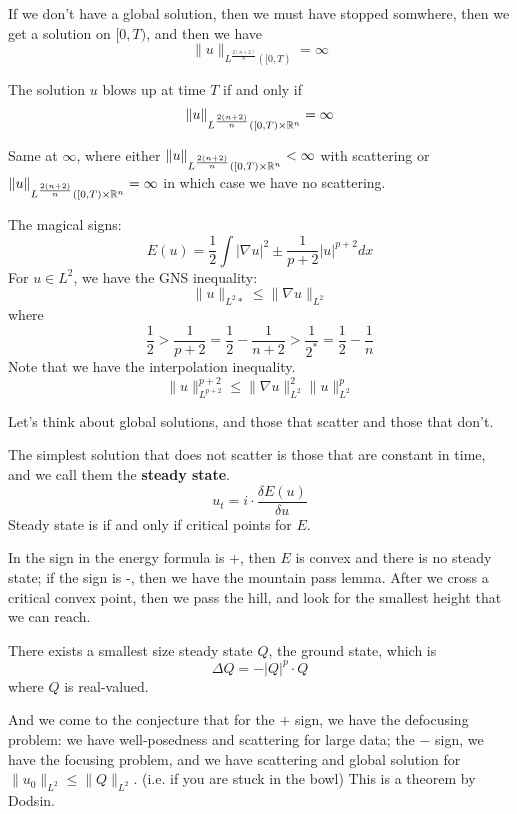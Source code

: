 If we don't have a global solution, then we must have stopped somwhere, then we get a solution on $[0,T)$, and then we have
\begin{equation*}
    \|u\|_{L^\frac{2(n+2)}{n}([0,T)}=\infty
\end{equation*}
\begin{theorem}
    The solution $u$ blows up at time $T$ if and only if 
    \begin{equation*}
        \|u\|_{L^\frac{2(n+2)}{n}([0,T)\times\mathbb{R}^n}=\infty
    \end{equation*}
\end{theorem}
Same at $\infty$, where either $ \|u\|_{L^\frac{2(n+2)}{n}([0,T)\times\mathbb{R}^n}<\infty$ with scattering or $ \|u\|_{L^\frac{2(n+2)}{n}([0,T)\times\mathbb{R}^n}=\infty$ in which case we have no scattering.

The magical signs:
\begin{equation*}
    E(u)=\frac{1}{2}\int|\nabla u|^2\pm\frac{1}{p+2}|u|^{p+2}dx
\end{equation*}
For $u\in L^2$, we have the GNS inequality:
\begin{equation*}
    \|u\|_{L^2*}\leq\|\nabla u\|_{L^2}
\end{equation*}
where
\begin{equation*}
    \frac{1}{2}>\frac{1}{p+2}=\frac{1}{2}-\frac{1}{n+2}>\frac{1}{2^*}=\frac{1}{2}-\frac{1}{n}
\end{equation*}
Note that we have the interpolation inequality.
\begin{equation*}
    \|u\|_{L^{p+2}}^{p+2}\leq\|\nabla u\|_{L^2}^2\|u\|_{L^2}^p
\end{equation*}

Let's think about global solutions, and those that scatter and those that don't. 

The simplest solution that does not scatter is those that are constant in time, and we call them the \textbf{ steady state}. 
\begin{equation*}
    u_t=i\cdot\frac{\delta E(u)}{\delta u}
\end{equation*}
Steady state is if and only if critical points for $E$.

In the sign in the energy formula is +, then $E$ is convex and there is no steady state; if the sign is -, then we have the mountain pass lemma. After we cross a critical convex point, then we pass the hill, and look for the smallest height that we can reach.

\begin{lemma}
    There exists a smallest size steady state $Q$, the ground state, which is
    \begin{equation*}
        \Delta Q=-|Q|^p\cdot Q
    \end{equation*}
    where $Q$ is real-valued.
\end{lemma}
And we come to the conjecture that for the $+$ sign, we have the defocusing problem:  we have well-posedness and scattering for large data; the $-$ sign, we have the focusing problem, and we have scattering and global solution for $\|u_0\|_{L^2}\leq\|Q\|_{L^2}$. (i.e. if you are stuck in the bowl) This is a theorem by Dodsin.


